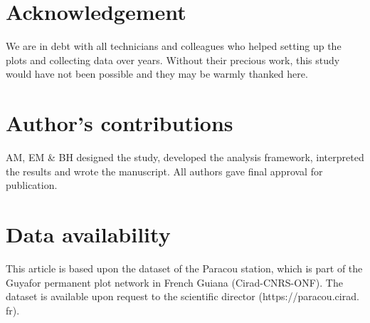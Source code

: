 \documentclass[fleqn,10pt]{ArtEcoFoG} %
\begin{document}
\section{Acknowledgement}\label{acknowledgement}

We are in debt with all technicians and colleagues who helped setting up
the plots and collecting data over years. Without their precious work,
this study would have not been possible and they may be warmly thanked
here.

\section{Author's contributions}\label{authors-contributions}

AM, EM \& BH designed the study, developed the analysis framework,
interpreted the results and wrote the manuscript. All authors gave final
approval for publication.

\section{Data availability}\label{data-availability}

This article is based upon the dataset of the Paracou station, which is
part of the Guyafor permanent plot network in French Guiana
(Cirad-CNRS-ONF). The dataset is available upon request to the
scientific director (https://paracou.cirad. fr).



\makeatletter

\makeatother


\end{document}

